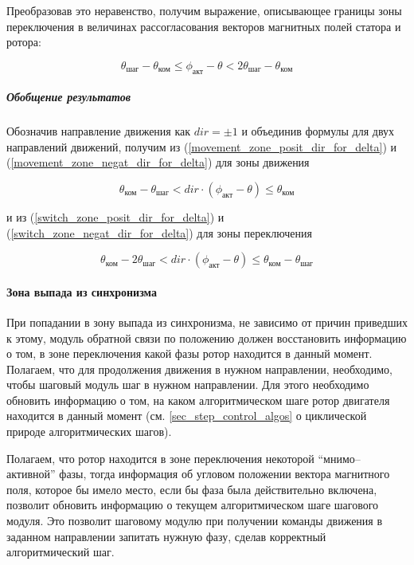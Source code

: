 Преобразовав это неравенство, получим выражение, описывающее границы зоны переключения
в величинах рассогласования векторов магнитных полей статора и ротора:

\begin{equation}
    \label{switch_zone_negat_dir_for_delta}
    \theta_\textit{шаг} - \theta_\textit{ком}
    \leq \phi_\textit{акт} - \theta
    < 2\theta_\textit{шаг} - \theta_\textit{ком}
\end{equation}


\subparagraph{Обобщение результатов}

Обозначив направление движения как $\textit{dir} = \pm 1$ и объединив формулы
для двух направлений движений, получим из (\ref{movement_zone_posit_dir_for_delta})
и (\ref{movement_zone_negat_dir_for_delta}) для зоны движения

\begin{equation}
    \label{movement_zone_for_delta}
    \theta_\textit{ком} - \theta_\textit{шаг}
    < dir \cdot (\phi_\textit{акт} - \theta)
    \leq \theta_\textit{ком}
\end{equation}

и из (\ref{switch_zone_posit_dir_for_delta})
и (\ref{switch_zone_negat_dir_for_delta}) для зоны переключения

\begin{equation}
    \label{switch_zone_for_delta}
    \theta_\textit{ком} - 2\theta_\textit{шаг}
    < dir \cdot (\phi_\textit{акт} - \theta)
    \leq \theta_\textit{ком} - \theta_\textit{шаг}
\end{equation}

\paragraph{Зона выпада из синхронизма}

При попадании в зону выпада из синхронизма, не зависимо от причин приведших к этому,
модуль обратной связи по положению должен восстановить информацию о том,
в зоне переключения какой фазы ротор находится в данный момент. Полагаем, что для
продолжения движения в нужном направлении, необходимо, чтобы шаговый модуль
шаг в нужном направлении. Для этого необходимо обновить информацию о том, на каком
алгоритмическом шаге ротор двигателя находится в данный момент
(см. \ref{sec_step_control_algos} о циклической природе алгоритмических шагов).

Полагаем, что ротор находится в зоне переключения некоторой ``мнимо--активной'' фазы,
тогда информация об угловом положении вектора магнитного поля, которое бы имело место,
если бы фаза была действительно включена, позволит обновить информацию о текущем
алгоритмическом шаге шагового модуля. Это позволит шаговому модулю при получении
команды движения в заданном направлении запитать нужную фазу, сделав корректный
алгоритмический шаг.

